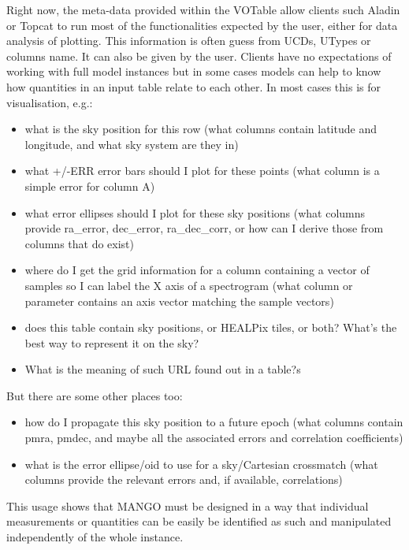 Right now, the meta-data provided within the VOTable allow clients such Aladin or Topcat to run most 
of the functionalities expected by the user, either for data analysis of plotting.
This information is often guess from UCDs, UTypes or columns name. It can also be given by the user.
Clients have no expectations of working with full model instances but in some cases models 
can help to know how quantities in an input table relate to each other.
In most cases this is for visualisation, e.g.:
\begin{itemize}
    \item what is the sky position for this row
    (what columns contain latitude and longitude, and what sky system are they in)

     \item what +/-ERR error bars should I plot for these points
    (what column is a simple error for column A)

    \item what error ellipses should I plot for these sky positions
    (what columns provide ra\_error, dec\_error, ra\_dec\_corr,
     or how can I derive those from columns that do exist)

    \item where do I get the grid information for a column containing
    a vector of samples so I can label the X axis of a spectrogram
    (what column or parameter contains an axis vector matching
     the sample vectors)

    \item does this table contain sky positions, or HEALPix tiles, or both?
    What's the best way to represent it on the sky?

    \item What is the meaning of such URL found out in a table?s
\end{itemize}

But there are some other places too:
\begin{itemize}
    \item how do I propagate this sky position to a future epoch
    (what columns contain pmra, pmdec, and maybe all the
     associated errors and correlation coefficients)

    \item what is the error ellipse/oid to use for a sky/Cartesian crossmatch
    (what columns provide the relevant errors and, if available,
     correlations)
\end{itemize}

This usage shows that MANGO must be designed in a way that individual measurements or quantities can be easily be identified as such and manipulated independently of the whole instance.
